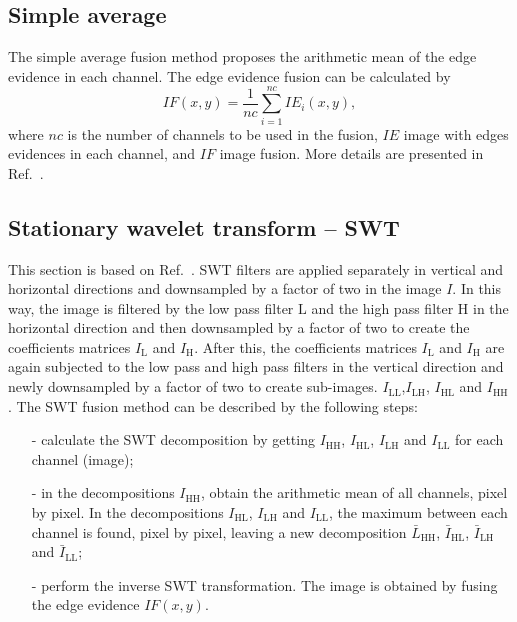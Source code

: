 \documentclass[conference]{IEEEtran}
\begin{document}
\subsection{Simple average}
The simple average fusion method proposes the arithmetic mean of the edge evidence in each channel. 
The edge evidence fusion can be calculated by
\begin{equation}
	IF(x,y)=\frac{1}{nc}\sum_{i=1}^{nc}IE_i(x,y),
\end{equation} 
where $nc$ is the number of channels to be used in the fusion, $IE$ image with edges evidences in each channel, and $IF$ image fusion.
More details are presented in Ref.~\cite{mit}.

\subsection{Stationary wavelet transform -- SWT} 

This section is based on Ref.~\cite{n_r}. SWT filters are applied separately in vertical and horizontal directions and downsampled by a factor of two in the image $I$. In this way, the image is filtered by the low pass filter $\text{L}$ and the high pass filter $\text{H}$ in the horizontal direction and then downsampled by a factor of two to create the coefficients matrices $I_\text{L}$ and $I_\text{H}$. After this, the coefficients matrices $I_\text{L}$ and $I_\text{H}$ are again subjected to the low pass and high pass filters in the vertical direction and newly downsampled by a factor of two to create sub-images. $ I_\text{LL}$,$I_\text{LH}$, $I_\text{HL}$ and $I_\text{HH}$.
The SWT fusion method can be described by the following steps:
\begin{itemize}
\item[-] calculate the SWT decomposition by getting $I_\text{HH}$, $I_\text{HL}$, $I_\text{LH}$ and $I_\text{LL}$ for each channel (image); %
\item[-] in the decompositions $I_\text{HH}$, obtain the arithmetic mean of all channels, pixel by pixel. In the decompositions $I_\text{HL}$, $I_\text{LH}$ and $I_\text{LL}$, the maximum between each channel is found, pixel by pixel, leaving a new decomposition $\bar{L}_\text{HH}$, $\bar{I}_\text{HL}$, $\bar{I}_\text{LH}$ and $\bar{I}_\text{LL}$;
\item[-] perform the inverse SWT transformation. The image is obtained by fusing the edge evidence $IF(x,y)$.  
\end{itemize}
\end{document}
